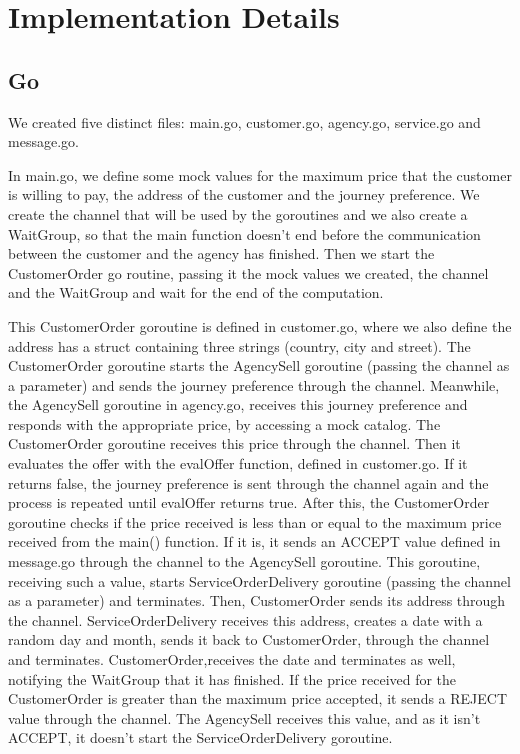 \documentclass[runningheads]{llncs}
\begin{document}
\section{Implementation Details}
\subsection{Go}
We created five distinct files: main.go, customer.go, agency.go, service.go and message.go.

In main.go, we define some mock values for the maximum price that the customer is willing to pay, the address of the customer and the journey preference. We create the channel that will be used by the goroutines and we also create a WaitGroup, so that the main function doesn't end before the communication between the customer and the agency has finished. Then we start the CustomerOrder go routine, passing it the mock values we created, the channel and the WaitGroup and wait for the end of the computation.

This CustomerOrder goroutine is defined in customer.go, where we also define the address has a struct containing three strings (country, city and street). The CustomerOrder goroutine starts the AgencySell goroutine (passing the channel as a parameter) and sends the journey preference through the channel. Meanwhile, the AgencySell goroutine in agency.go, receives this journey preference and responds with the appropriate price, by accessing a mock catalog. The CustomerOrder goroutine receives this price through the channel. Then it evaluates the offer with the evalOffer function, defined in customer.go. If it returns false, the journey preference is sent through the channel again and the process is repeated until evalOffer returns true. After this, the CustomerOrder goroutine checks if the price received is less than or equal to the maximum price received from the main() function. If it is, it sends an ACCEPT value defined in message.go through the channel to the AgencySell goroutine. This goroutine, receiving such a value, starts ServiceOrderDelivery goroutine (passing the channel as a parameter) and terminates. Then, CustomerOrder sends its address through the channel. ServiceOrderDelivery receives this address, creates a date with a random day and month, sends it back to CustomerOrder, through the channel and terminates. CustomerOrder,receives the date and terminates as well, notifying the WaitGroup that it has finished. If the price received for the CustomerOrder is greater than the maximum price accepted, it sends a REJECT value through the channel. The AgencySell receives this value, and as it isn't ACCEPT, it doesn't start the ServiceOrderDelivery goroutine.
\end{document}
